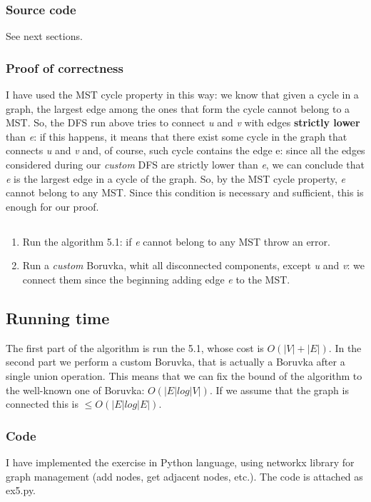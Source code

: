 \documentclass[12pt]{article}
\begin{document}
\subsubsection{Source code}
See next sections.

\subsubsection{Proof of correctness}
I have used the MST cycle property in this way: we know that given a cycle in a graph, the largest edge among the ones that form the cycle cannot belong to a MST. So, the DFS run above tries to connect \textit{u} and \textit{v} with edges \textbf{strictly lower} than \textit{e}: if this happens, it means that there exist some cycle in the graph that connects \textit{u} and \textit{v} and, of course, such cycle contains the edge e: since all the edges considered during our \textit{custom} DFS are strictly lower than \textit{e}, we can conclude that \textit{e} is the largest edge in a cycle of the graph. So, by the MST cycle property, \textit{e} cannot belong to any MST. Since this condition is necessary and sufficient, this is enough for our proof.

\subsection{}
\begin{enumerate}
	\item Run the algorithm 5.1: if \textit{e} cannot belong to any MST throw an error.
	\item Run a \textit{custom} Boruvka, whit all disconnected components, except \textit{u} and \textit{v}: we connect them since the beginning adding edge \textit{e} to the MST.
\end{enumerate}

\subsection*{Running time}
The first part of the algorithm is run the 5.1, whose cost is $O(|V| + |E|)$. In the second part we perform a custom Boruvka, that is actually a Boruvka after a single union operation. This means that we can fix the bound of the algorithm to the well-known one of Boruvka: $O(|E| log|V|)$. If we assume that the graph is connected this is $\leq O(|E| log|E|)$.

\subsubsection{Code}
I have implemented the exercise in Python language, using networkx library for graph management (add nodes, get adjacent nodes, etc.). The code is attached as ex5.py.
\end{document}
